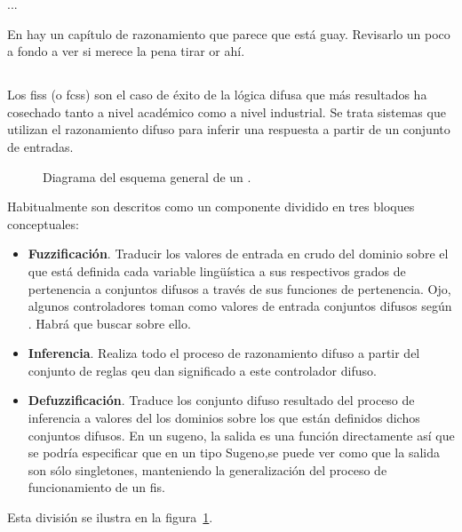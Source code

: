 
...

En \cite{Ma2004} hay un capítulo de razonamiento que parece que está guay. Revisarlo un poco a fondo a ver si merece la pena tirar or ahí.

\subsection{}

Los \glspl{fis} (o \glspl{fcs}) son el caso de éxito de la lógica difusa que más resultados ha cosechado tanto a nivel académico como a nivel industrial. Se trata sistemas que utilizan el razonamiento difuso para inferir una respuesta a partir de un conjunto de entradas.

\begin{figure}
	\caption[Diagrama general de un ]{Diagrama del esquema general de un .}
	\label{fig:fis-general-schema}
\end{figure}

Habitualmente son descritos como un componente dividido en tres bloques conceptuales:

\begin{itemize}
	\item \textbf{Fuzzificación}. Traducir los valores de entrada en crudo del dominio sobre el que está definida cada variable lingüística a sus respectivos grados de pertenencia a conjuntos difusos a través de sus funciones de pertenencia. \TODO Ojo, algunos controladores toman como valores de entrada conjuntos difusos según \cite{Ma2004}. Habrá que buscar sobre ello.
	\item \textbf{Inferencia}. Realiza todo el proceso de razonamiento difuso a partir del conjunto de reglas qeu dan significado a este controlador difuso.
	\item \textbf{Defuzzificación}. Traduce los conjunto difuso resultado del proceso de inferencia a valores del los dominios sobre los que están definidos dichos conjuntos difusos. \TODO En un sugeno, la salida es una función directamente así que se podría especificar que en un tipo Sugeno,se puede ver como que la salida son sólo singletones, manteniendo la generalización del proceso de funcionamiento de un \ac{fis}.
\end{itemize}

Esta división se ilustra en la figura~\ref{fig:fis-general-schema}.

